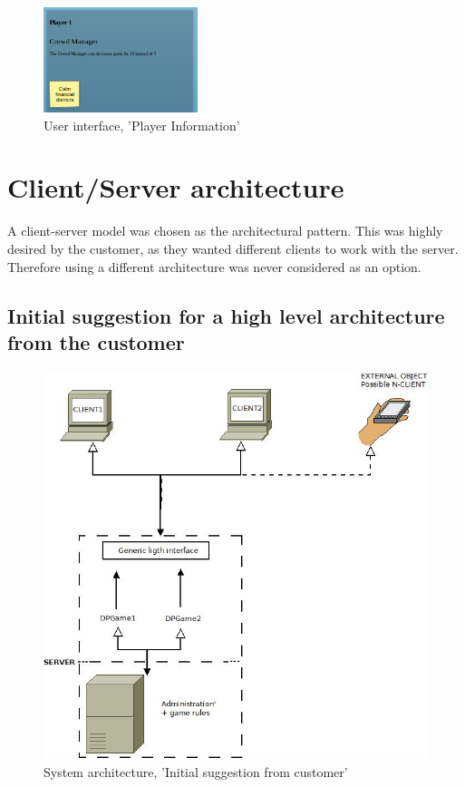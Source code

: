 \begin{figure}[H]
  \centering
    \includegraphics[width=0.4\textwidth]{img/playerinfo.png}
  \caption{User interface, 'Player Information'} 
  \label{fig:playerinfo}
\end{figure}




\section{Client/Server architecture}
A client-server model was chosen as the architectural pattern. This was highly desired by the customer, as they wanted different clients
to work with the server. Therefore using a different architecture was never considered as an option.

\subsection{Initial suggestion for a high level architecture from the customer}

\begin{figure}[H]
  \centering
    \includegraphics[width=1.0\textwidth]{img/Client-serverarchitecture.jpeg}
  \caption{System architecture, 'Initial suggestion from customer'} 
  \label{fig:initialsuggestion}
\end{figure}



